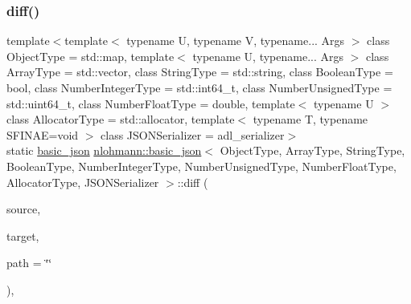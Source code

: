\mbox{\label{classnlohmann_1_1basic__json_a543bd5f7490de54c875b2c0912dc9a49}} 
\subsubsection{\texorpdfstring{diff()}{diff()}}
{\footnotesize\ttfamily template$<$template$<$ typename U, typename V, typename... Args $>$ class Object\+Type = std\+::map, template$<$ typename U, typename... Args $>$ class Array\+Type = std\+::vector, class String\+Type  = std\+::string, class Boolean\+Type  = bool, class Number\+Integer\+Type  = std\+::int64\+\_\+t, class Number\+Unsigned\+Type  = std\+::uint64\+\_\+t, class Number\+Float\+Type  = double, template$<$ typename U $>$ class Allocator\+Type = std\+::allocator, template$<$ typename T, typename S\+F\+I\+N\+A\+E=void $>$ class J\+S\+O\+N\+Serializer = adl\+\_\+serializer$>$ \\
static \mbox{\hyperlink{classnlohmann_1_1basic__json}{basic\+\_\+json}} \mbox{\hyperlink{classnlohmann_1_1basic__json}{nlohmann\+::basic\+\_\+json}}$<$ Object\+Type, Array\+Type, String\+Type, Boolean\+Type, Number\+Integer\+Type, Number\+Unsigned\+Type, Number\+Float\+Type, Allocator\+Type, J\+S\+O\+N\+Serializer $>$\+::diff (\begin{DoxyParamCaption}\item[{const \mbox{\hyperlink{classnlohmann_1_1basic__json}{basic\+\_\+json}}$<$ Object\+Type, Array\+Type, String\+Type, Boolean\+Type, Number\+Integer\+Type, Number\+Unsigned\+Type, Number\+Float\+Type, Allocator\+Type, J\+S\+O\+N\+Serializer $>$ \&}]{source,  }\item[{const \mbox{\hyperlink{classnlohmann_1_1basic__json}{basic\+\_\+json}}$<$ Object\+Type, Array\+Type, String\+Type, Boolean\+Type, Number\+Integer\+Type, Number\+Unsigned\+Type, Number\+Float\+Type, Allocator\+Type, J\+S\+O\+N\+Serializer $>$ \&}]{target,  }\item[{const std\+::string \&}]{path = {\ttfamily \char`\"{}\char`\"{}} }\end{DoxyParamCaption})\hspace{0.3cm}{\ttfamily [inline]}, {\ttfamily [static]}}



